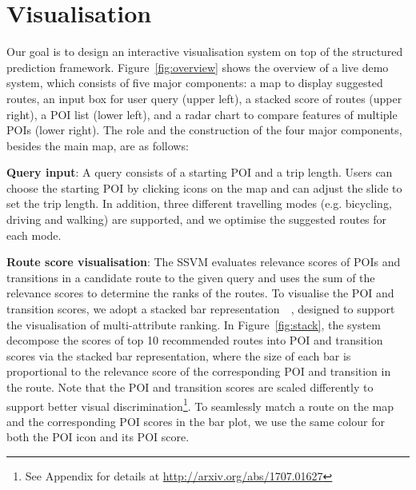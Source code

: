 \section{Visualisation}
Our goal is to design an interactive visualisation system on top of the structured prediction framework.
Figure~\ref{fig:overview} shows the overview of a live demo system, which consists of five major components: a map to display suggested routes, an input box for user query (upper left), a stacked score of routes (upper right), a POI list (lower left), and a radar chart to compare features of multiple POIs (lower right). 
The role and the construction of the four major components, besides the main map, are as follows:

\textbf{Query input}: A query consists of a starting POI and a trip length. 
Users can choose the starting POI by clicking icons on the map and can adjust the slide to set the trip length. 
In addition, three different travelling modes (e.g. bicycling, driving and walking) are supported, 
and we optimise the suggested routes for each mode.

\textbf{Route score visualisation}: 
The SSVM evaluates relevance scores of POIs and transitions in a candidate route to the given query and uses the sum of the relevance scores to determine the ranks of the routes.
To visualise the POI and transition scores, we adopt a stacked bar representation~~\cite{gratzl2013lineup}, designed to support the visualisation of multi-attribute ranking.
In Figure~\ref{fig:stack}, the system decompose the scores of top 10 recommended routes into POI and transition scores via the stacked bar representation, where the size of each bar is proportional to the relevance score of the corresponding POI and transition in the route.
Note that the POI and transition scores are scaled differently to support better visual discrimination\footnote{See Appendix for details at \url{http://arxiv.org/abs/1707.01627}}.
To seamlessly match a route on the map and the corresponding POI scores in the bar plot,
we use the same colour for both the POI icon and its POI score.


